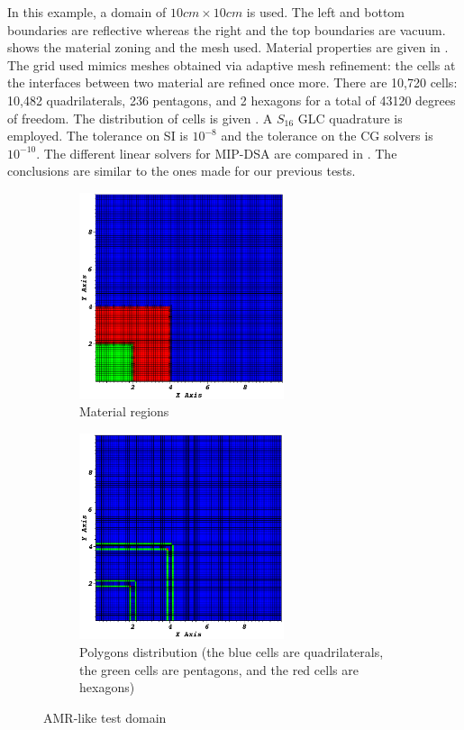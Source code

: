 In this example, a domain of $10cm\times 10cm$ is used. The left and bottom
boundaries are reflective whereas the right and the top boundaries are vacuum. 
 shows the material zoning and the mesh used. Material properties 
are given in . The grid used mimics meshes obtained via adaptive mesh
refinement: the cells at the interfaces between two material are refined once more.
There are 10,720 cells: 10,482 quadrilaterals, 236 pentagons,
and 2 hexagons for a total of 43120 degrees of freedom. 
%
The distribution of cells is given .
A $S_{16}$ GLC quadrature is employed. The tolerance on SI is $10^{-8}$ and
the tolerance on the CG solvers is $10^{-10}$.
The different linear solvers for MIP-DSA are compared in .
%
The conclusions are similar to the ones made for our previous tests.
%
\begin{figure}[!htbp]
  \centering
  \begin{subfigure}{0.75\textwidth}
    \centering
    \includegraphics[width=6cm]{zone_amr}
    \caption{Material regions}
  \end{subfigure}
  \begin{subfigure}{0.75\textwidth}
    \centering
    \includegraphics[width=6cm]{polygon_amr}
    \caption{Polygons distribution (the blue cells are quadrilaterals, the green cells are pentagons, and the red cells are hexagons)}
    \label{fig_pol_dist}
  \end{subfigure}
  \caption{AMR-like test domain}
  \label{zone_amr}
\end{figure}

